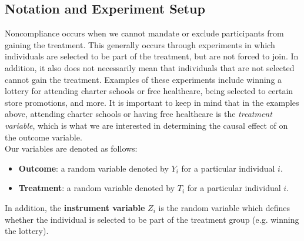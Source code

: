 \documentclass{article}
\begin{document}
\subsection{Notation and Experiment Setup}
Noncompliance occurs when we cannot mandate or exclude participants from gaining the treatment.
This generally occurs through experiments in which individuals are selected to be part of the treatment, but are not forced to join.
In addition, it also does not necessarily mean that individuals that are not selected cannot gain the treatment. 
Examples of these experiments include winning a lottery for attending charter schools or free healthcare, being selected to certain store promotions, and more. 
It is important to keep in mind that in the examples above, attending charter schools or having free healthcare is the \textit{treatment variable}, which is what we are interested in determining the causal effect of on the outcome variable. 
\\
Our variables are denoted as follows: 
\begin{itemize}
    \item \textbf{Outcome}: a random variable denoted by $Y_i$ for a particular individual $i$.
    \item \textbf{Treatment}: a random variable denoted by $T_i$ for a particular individual $i$.
\end{itemize}
In addition, the \textbf{instrument variable} $Z_i$ is the random variable which defines whether the individual is selected to be part of the treatment group (e.g. winning the lottery).
\end{document}

